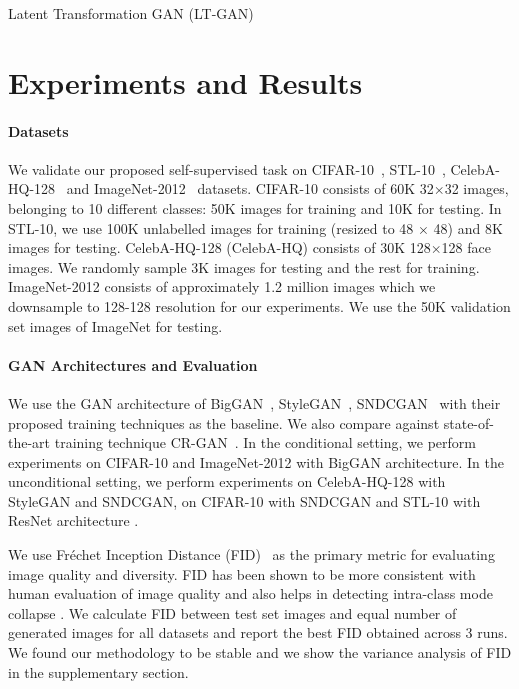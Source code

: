 \documentclass[10pt,twocolumn,letterpaper]{article}
\begin{document}
\begin{algorithm}[t]
{{{    }
    
    
    }
 }
 \caption{\footnotesize{Latent Transformation GAN (LT-GAN)}}
\label{lt_gan_algo}
\end{algorithm}



\section{Experiments and Results}
\vspace{-5pt}
\paragraph{Datasets} 
We validate our proposed self-supervised task on CIFAR-10~\cite{krizhevsky2010cifar}, STL-10~\cite{stl10}, CelebA-HQ-128~\cite{pggan2018celeba} and ImageNet-2012~\cite{krizhevsky2012imagenet} datasets. CIFAR-10 consists of 60K 32$\times$32 images, belonging to 10 different classes: 50K images for training and 10K for testing. In STL-10, we use 100K unlabelled images for training (resized to 48 $\times$ 48) and 8K images for testing. CelebA-HQ-128 (CelebA-HQ) consists of 30K 128$\times$128 face images. We randomly sample 3K images for testing and the rest for training. ImageNet-2012 consists of approximately 1.2 million images which we downsample to 128-128 resolution for our experiments. We use the 50K validation set images of ImageNet for testing. 

\paragraph{GAN Architectures and Evaluation}
We use the GAN architecture of BigGAN~\cite{biggan2018brock}, StyleGAN~\cite{stylegan2019karras}, SNDCGAN~\cite{sngan_proj} with their proposed training techniques as the baseline. We also compare against state-of-the-art training technique CR-GAN~\cite{crgan2019chen}. In the conditional setting, we perform experiments on CIFAR-10 and ImageNet-2012 with BigGAN architecture. In the unconditional setting, we perform experiments on CelebA-HQ-128 with StyleGAN and SNDCGAN, on CIFAR-10 with SNDCGAN and STL-10 with ResNet architecture \cite{sngan_proj}. 
\par
We use Fr\'echet Inception Distance (FID)~\cite{fid2017martin} as the primary metric for evaluating image quality and diversity. FID has been shown to be more consistent with human evaluation of image quality and also helps in detecting intra-class mode collapse \cite{fid2017martin}. We calculate FID between test set images and equal number of generated images for all datasets and report the best FID obtained across 3 runs. We found our methodology to be stable and we show the variance analysis of FID in the supplementary section. 
\end{document}
